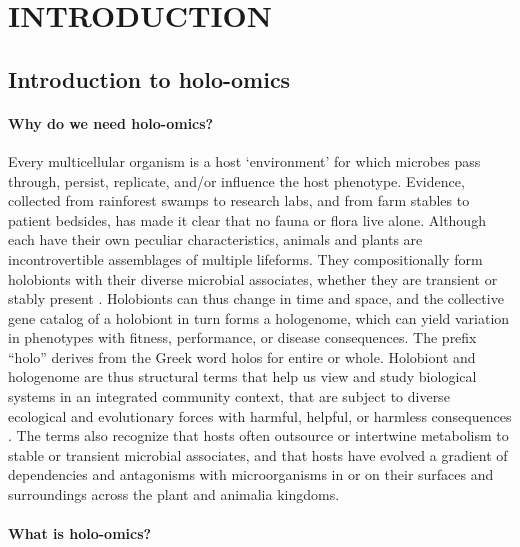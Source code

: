 \documentclass[
]{book}
\begin{document}
\hypertarget{part-introduction}{%
\part{INTRODUCTION}\label{part-introduction}}

\hypertarget{holo-omics}{%
\chapter{Introduction to holo-omics}\label{holo-omics}}

\hypertarget{why-holo-omics}{%
\subsection*{Why do we need holo-omics?}\label{why-holo-omics}}

Every multicellular organism is a host `environment' for which microbes pass through, persist, replicate, and/or influence the host phenotype. Evidence, collected from rainforest swamps to research labs, and from farm stables to patient bedsides, has made it clear that no fauna or flora live alone. Although each have their own peculiar characteristics, animals and plants are incontrovertible assemblages of multiple lifeforms. They compositionally form holobionts with their diverse microbial associates, whether they are transient or stably present \citep{Theis2016-dc}. Holobionts can thus change in time and space, and the collective gene catalog of a holobiont in turn forms a hologenome, which can yield variation in phenotypes with fitness, performance, or disease consequences. The prefix ``holo'' derives from the Greek word holos for entire or whole. Holobiont and hologenome are thus structural terms that help us view and study biological systems in an integrated community context, that are subject to diverse ecological and evolutionary forces with harmful, helpful, or harmless consequences \citep{Rosenberg2013-dc}. The terms also recognize that hosts often outsource or intertwine metabolism to stable or transient microbial associates, and that hosts have evolved a gradient of dependencies and antagonisms with microorganisms in or on their surfaces and surroundings across the plant and animalia kingdoms.

\hypertarget{what-is-holo-omics}{%
\subsection*{What is holo-omics?}\label{what-is-holo-omics}}
\end{document}
